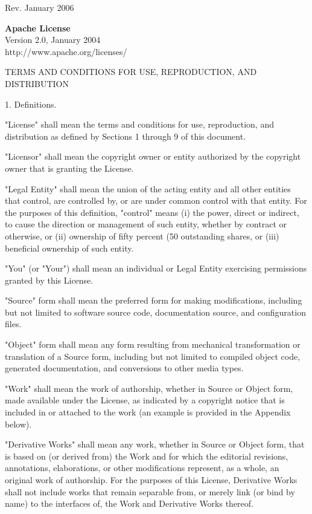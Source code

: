 \begin{flushleft}
Rev. January 2006


\vspace{2em}

\begin{center}
                                 {\bfseries Apache License}\\
                           Version 2.0, January 2004\\
                        http://www.apache.org/licenses/

   TERMS AND CONDITIONS FOR USE, REPRODUCTION, AND DISTRIBUTION
\end{center}

   1. Definitions.

      "License" shall mean the terms and conditions for use, reproduction,
      and distribution as defined by Sections 1 through 9 of this document.

      "Licensor" shall mean the copyright owner or entity authorized by
      the copyright owner that is granting the License.

      "Legal Entity" shall mean the union of the acting entity and all
      other entities that control, are controlled by, or are under common
      control with that entity. For the purposes of this definition,
      "control" means (i) the power, direct or indirect, to cause the
      direction or management of such entity, whether by contract or
      otherwise, or (ii) ownership of fifty percent (50%
      outstanding shares, or (iii) beneficial ownership of such entity.

      "You" (or "Your") shall mean an individual or Legal Entity
      exercising permissions granted by this License.

      "Source" form shall mean the preferred form for making modifications,
      including but not limited to software source code, documentation
      source, and configuration files.

      "Object" form shall mean any form resulting from mechanical
      transformation or translation of a Source form, including but
      not limited to compiled object code, generated documentation,
      and conversions to other media types.

      "Work" shall mean the work of authorship, whether in Source or
      Object form, made available under the License, as indicated by a
      copyright notice that is included in or attached to the work
      (an example is provided in the Appendix below).

      "Derivative Works" shall mean any work, whether in Source or Object
      form, that is based on (or derived from) the Work and for which the
      editorial revisions, annotations, elaborations, or other modifications
      represent, as a whole, an original work of authorship. For the purposes
      of this License, Derivative Works shall not include works that remain
      separable from, or merely link (or bind by name) to the interfaces of,
      the Work and Derivative Works thereof.


\end{flushleft}
